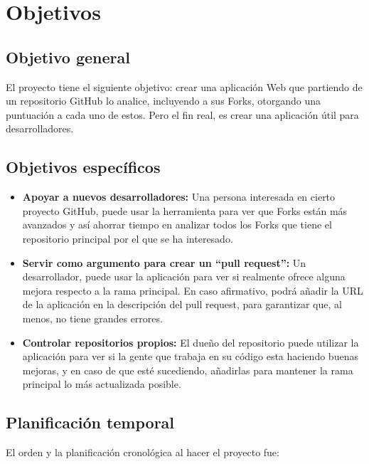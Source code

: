 \documentclass[a4paper, 12pt]{book}
\begin{document}


\chapter{Objetivos}
\label{chap:objetivos}

\section{Objetivo general}
El proyecto tiene el siguiente objetivo: crear una aplicación Web que partiendo de un repositorio GitHub lo analice, incluyendo a sus Forks, otorgando una puntuación a cada uno de estos. Pero el fin real, es crear una aplicación útil para desarrolladores. 

\section{Objetivos específicos}
\begin{itemize}
\item\textbf{Apoyar a nuevos desarrolladores:} Una persona interesada en cierto proyecto GitHub, puede usar la herramienta para ver que Forks están más avanzados y así ahorrar tiempo en analizar todos los Forks que tiene el repositorio principal por el que se ha interesado. 

\item\textbf{Servir como argumento para crear un ``pull request'':} Un desarrollador, puede usar la aplicación para ver si realmente ofrece alguna mejora respecto a la rama principal. En caso afirmativo, podrá añadir la URL de la aplicación en la descripción del pull request, para garantizar que, al menos, no tiene grandes errores.

\item\textbf{Controlar repositorios propios:} El dueño del repositorio puede utilizar la aplicación para ver si la gente que trabaja en su código esta haciendo buenas mejoras, y en caso de que esté sucediendo, añadirlas para mantener la rama principal lo más actualizada posible.
\end{itemize}

\section{Planificación temporal}
\label{sec:planificacion-temporal}
El orden y la planificación cronológica al hacer el proyecto fue:
\end{document}
